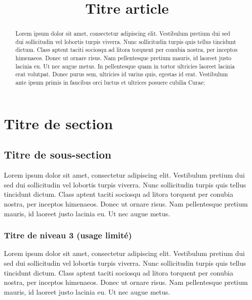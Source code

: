 ﻿\documentclass[year=2013]{jres}
\title{Titre article}
\begin{document}
\maketitle

\begin{abstract}
Lorem ipsum dolor sit amet, consectetur adipiscing elit. Vestibulum pretium dui sed dui sollicitudin vel lobortis turpis viverra. Nunc sollicitudin turpis quis tellus tincidunt dictum. Class aptent taciti sociosqu ad litora torquent per conubia nostra, per inceptos himenaeos. Donec ut ornare risus. Nam pellentesque pretium mauris, id laoreet justo lacinia eu. Ut nec augue metus. In pellentesque quam in tortor ultricies laoreet lacinia erat volutpat. Donec purus sem, ultricies id varius quis, egestas id erat. Vestibulum ante ipsum primis in faucibus orci luctus et ultrices posuere cubilia Curae; 
\end{abstract}



\section{Titre de section}

\subsection{Titre de sous-section}

Lorem ipsum dolor sit amet, consectetur adipiscing elit. Vestibulum pretium dui sed dui sollicitudin vel lobortis turpis viverra. Nunc sollicitudin turpis quis tellus tincidunt dictum. Class aptent taciti sociosqu ad litora torquent per conubia nostra, per inceptos himenaeos. Donec ut ornare risus. Nam pellentesque pretium mauris, id laoreet justo lacinia eu. Ut nec augue metus. 

\subsubsection{Titre de niveau 3 (usage limité)}

Lorem ipsum dolor sit amet, consectetur adipiscing elit. Vestibulum pretium dui sed dui sollicitudin vel lobortis turpis viverra. Nunc sollicitudin turpis quis tellus tincidunt dictum. Class aptent taciti sociosqu ad litora torquent per conubia nostra, per inceptos himenaeos.
 Donec ut ornare risus. Nam pellentesque pretium mauris, id laoreet justo lacinia eu. Ut nec augue metus. 
\end{document}
